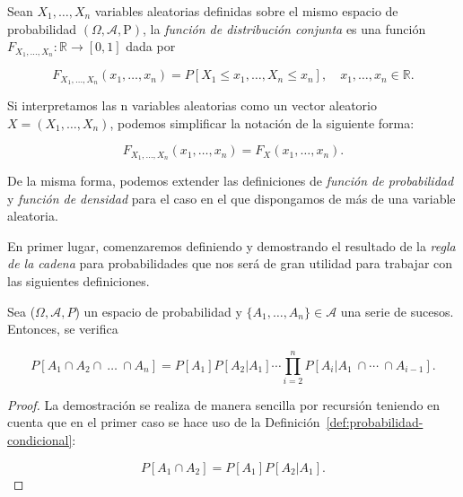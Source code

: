 \begin{definicion}\label{def:funcion-de-distribucion-conjunta}
    Sean $X_1, \ldots, X_n$ variables aleatorias definidas sobre el mismo espacio de probabilidad $(\Omega, \mathcal{A}, \mathrm{P})$, la \emph{función de distribución conjunta} es una función $F_{X_{1}, \ldots, X_{n}}: \mathbb{R} \to [0,1]$ dada por

    \[ F_{X_{1}, \ldots, X_{n}}(x_1, \ldots, x_n) = P[X_1 \leq x_1, \ldots, X_n \leq x_n], \quad x_1, \ldots, x_n \in \mathbb{R}. \]

    Si interpretamos las n variables aleatorias como un vector aleatorio $X = (X_1, \ldots, X_n)$, podemos simplificar la notación de la siguiente forma:

    \[ F_{X_{1}, \ldots, X_{n}}(x_1, \ldots, x_n) = F_X(x_1, \ldots, x_n). \]
\end{definicion}

De la misma forma, podemos extender las definiciones de \emph{función de probabilidad} y \emph{función de densidad} para el caso en el que dispongamos de más de una variable aleatoria.

En primer lugar, comenzaremos definiendo y demostrando el resultado de la \emph{regla de la cadena} para probabilidades que nos será de gran utilidad para trabajar con las siguientes definiciones.

\begin{teorema}
    Sea ($\Omega, \mathcal{A}, P$) un espacio de probabilidad y $\{A_1, \ldots, A_n \} \in \mathcal{A}$ una serie de sucesos. Entonces, se verifica

    \[ P[A_1 \cap A_2 \cap \ \ldots \ \cap A_n] =  P[A_1]P[A_2 | A_1]\cdots \prod_{i=2}^n P[A_i | A_1 \ \cap \cdots \ \cap A_{i-1}]. \]
\end{teorema}

\begin{proof}
    La demostración se realiza de manera sencilla por recursión teniendo en cuenta que en el primer caso se hace uso de la Definición~\ref{def:probabilidad-condicional}:

    \[ P[A_1 \cap A_2] = P[A_1]P[A_2| A_1]. \]
\end{proof}

